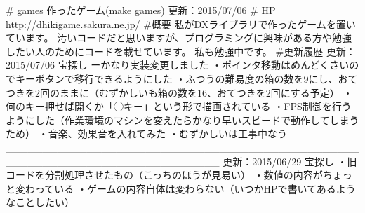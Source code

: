 # games
作ったゲーム(make games)
更新：2015/07/06
# HP
http://dhikigame.sakura.ne.jp/
#概要
私がDXライブラリで作ったゲームを置いています。
汚いコードだと思いますが、プログラミングに興味がある方や勉強したい人のためにコードを載せています。
私も勉強中です。
#更新履歴
更新：2015/07/06
宝探し
ーかなり実装変更しました
・ポインタ移動はめんどくさいのでキーボタンで移行できるようにした
・ふつうの難易度の箱の数を9にし、おてつきを2回のままに（むずかしいも箱の数を16、おてつきを2回にする予定）
・何のキー押せば開くか「◯キー」という形で描画されている
・FPS制御を行うようにした（作業環境のマシンを変えたらかなり早いスピードで動作してしまうため）
・音楽、効果音を入れてみた
・むずかしいは工事中なう
_____________________________________________________________________________
更新：2015/06/29
宝探し
・旧コードを分割処理させたもの（こっちのほうが見易い）
・数値の内容がちょっと変わっている
・ゲームの内容自体は変わらない（いつかHPで書いてあるようなことしたい）
